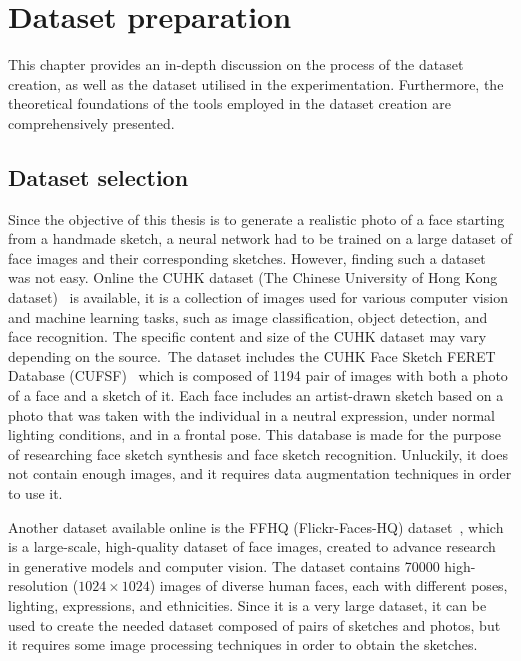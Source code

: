 \newpage
\section{Dataset preparation}
\label{section:datasetChapter}
This chapter provides an in-depth discussion on the process of the dataset creation, as well as the dataset utilised in the experimentation. Furthermore, the theoretical foundations of the tools employed in the dataset creation are comprehensively presented.

\subsection{Dataset selection}
Since the objective of this thesis is to generate a realistic photo of a face starting from a handmade sketch, a neural network had to be trained on a large dataset of face images and their corresponding sketches. However, finding such a dataset was not easy. Online the CUHK dataset (The Chinese University of Hong Kong dataset)~\cite{cuhk} is available, it is a collection of images used for various computer vision and machine learning tasks, such as image classification, object detection, and face recognition. The specific content and size of the CUHK dataset may vary depending on the source. The dataset includes the CUHK Face Sketch FERET Database (CUFSF)~\cite{facePhotoSketch-cuhk, coupledInformationTheoretic-cuhk} which is composed of \num{1194} pair of images with both a photo of a face and a sketch of it. Each face includes an artist-drawn sketch based on a photo that was taken with the individual in a neutral expression, under normal lighting conditions, and in a frontal pose. This database is made for the purpose of researching face sketch synthesis and face sketch recognition. Unluckily, it does not contain enough images, and it requires data augmentation techniques in order to use it.

\noindent Another dataset available online is the FFHQ (Flickr-Faces-HQ) dataset~\cite{ffhq}, which is a large-scale, high-quality dataset of face images, created to advance research in generative models and computer vision. The dataset contains \num{70000} high-resolution ($1024 \times 1024$) images of diverse human faces, each with different poses, lighting, expressions, and ethnicities. Since it is a very large dataset, it can be used to create the needed dataset composed of pairs of sketches and photos, but it requires some image processing techniques in order to obtain the sketches.

